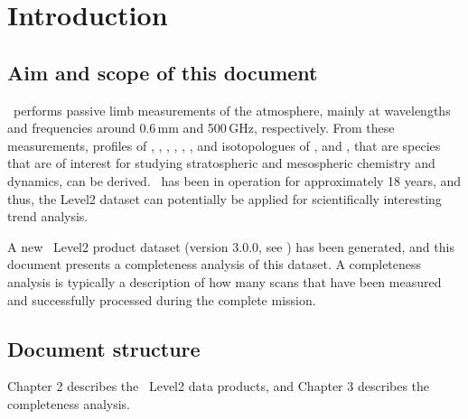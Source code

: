 \chapter{Introduction}
\label{chapter:introduction}


\setcounter{page}{1}


\section{Aim and scope of this document}
\label{sec:aim}
\smr\ performs passive limb measurements of the atmosphere,
mainly at wavelengths and frequencies around 0.6\,mm and 500\,GHz,
respectively.
From these measurements, profiles of 
, , , , 
, , and isotopologues of , and ,
that are species that are of interest for studying stratospheric and 
mesospheric chemistry and dynamics, can be derived. 
\smr\ has been in operation for approximately 18 years, and thus, the Level2
dataset can potentially be applied for scientifically interesting trend analysis.

A new \smr\ Level2 product dataset (version 3.0.0, see \cite{pver}) has been generated, and
this document presents a completeness analysis of this dataset. A completeness analysis
is typically a description of how many scans that have been measured
and successfully processed during the complete mission.

\section{Document structure}

Chapter 2 describes the \smr\ Level2 data products,
and Chapter 3 describes the completeness analysis.
